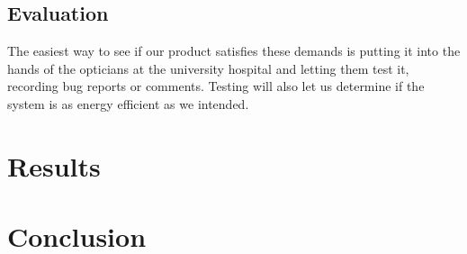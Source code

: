\documentclass[12pt,a4paper,notitlepage]{report}
\begin{document}
\section{Evaluation} %
The easiest way to see if our product satisfies these demands is putting it into the hands of the opticians at the university hospital and letting them test it, recording bug reports or comments. Testing will also let us determine if the system is as energy efficient as we intended.


\chapter{Results}

\chapter{Conclusion}




{}

\end{document}
